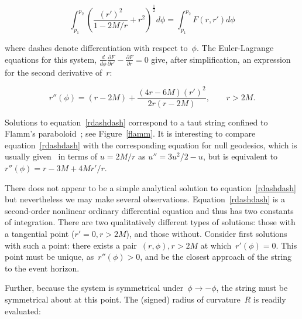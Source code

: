 \begin{equation}
  \int_{p_1}^{p_2}\left(\frac{\left(r'\right)^2}{1-2M/r} + r^2\right)^\frac{1}{2}d\phi=
  \int_{p_1}^{p_2}F\left(r,r'\right)d\phi
\end{equation}

\noindent where dashes denote differentiation with respect to~$\phi$.  The
Euler-Lagrange equations for this system,
$\frac{d}{d\phi}\frac{\partial F}{\partial r'}-\frac{\partial
  F}{\partial r}=0$ give, after simplification, an expression for the
second derivative of~$r$:

\begin{equation}\label{rdashdash}
  r''\left(\phi\right) =
  (r-2M) + \frac{(4r-6M)\left(r'\right)^2}{2r\left(r-2M\right)},\qquad r>2M.
\end{equation}

\noindent 
Solutions to equation~\ref{rdashdash} correspond to a taut string
confined to Flamm's paraboloid~\cite{flamm1916}; see
Figure~\ref{flamm}.  It is interesting to compare
equation~\ref{rdashdash} with the corresponding equation for null
geodesics, which is usually given~\cite{wald} in terms of $u=2M/r$ as
$u''=3u^2/2-u$, but is equivalent
to~$r''\left(\phi\right)=r-3M+4Mr'/r$.

There does not appear to be a simple analytical solution to
equation~\ref{rdashdash} but nevertheless we may make several
observations.  Equation~\ref{rdashdash} is a second-order nonlinear
ordinary differential equation and thus has two constants of
integration.  There are two qualitatively different types of
solutions: those with a tangential point ($r'=0,r>2M$), and those
without.  Consider first solutions with such a point: there exists a
pair~$\left(r,\phi\right), r>2M$ at which~$r'(\phi)=0$.  This point
must be unique, as~$r''(\phi)>0$, and be the closest approach of the
string to the event horizon.

Further, because the system is symmetrical
under~$\phi\longrightarrow-\phi$, the string must be symmetrical about
at this point.  The (signed) radius of curvature~$R$ is readily
evaluated:


